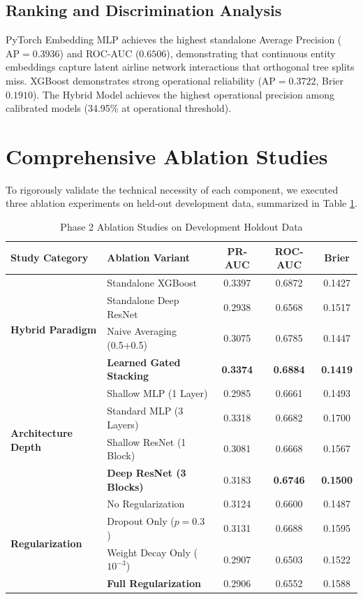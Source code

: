 \documentclass[conference]{IEEEtran}
\begin{document}
\subsection{Ranking and Discrimination Analysis}
PyTorch Embedding MLP achieves the highest standalone Average Precision ($\text{AP} = 0.3936$) and ROC-AUC ($0.6506$), demonstrating that continuous entity embeddings capture latent airline network interactions that orthogonal tree splits miss. XGBoost demonstrates strong operational reliability ($\text{AP} = 0.3722$, Brier $0.1910$). The Hybrid Model achieves the highest operational precision among calibrated models (34.95\% at operational threshold).

\section{Comprehensive Ablation Studies}
To rigorously validate the technical necessity of each component, we executed three ablation experiments on held-out development data, summarized in Table \ref{tab:ablation}.

\begin{table}[h]
\centering
\caption{Phase 2 Ablation Studies on Development Holdout Data}
\label{tab:ablation}
\begin{tabular}{llccc}
\toprule
\textbf{Study Category} & \textbf{Ablation Variant} & \textbf{PR-AUC} & \textbf{ROC-AUC} & \textbf{Brier} \\
\midrule
\multirow{4}{*}{\textbf{Hybrid Paradigm}} 
& Standalone XGBoost & 0.3397 & 0.6872 & 0.1427 \\
& Standalone Deep ResNet & 0.2938 & 0.6568 & 0.1517 \\
& Naive Averaging (0.5+0.5) & 0.3075 & 0.6785 & 0.1447 \\
& \textbf{Learned Gated Stacking} & \textbf{0.3374} & \textbf{0.6884} & \textbf{0.1419} \\
\midrule
\multirow{4}{*}{\textbf{Architecture Depth}} 
& Shallow MLP (1 Layer) & 0.2985 & 0.6661 & 0.1493 \\
& Standard MLP (3 Layers) & 0.3318 & 0.6682 & 0.1700 \\
& Shallow ResNet (1 Block) & 0.3081 & 0.6668 & 0.1567 \\
& \textbf{Deep ResNet (3 Blocks)} & 0.3183 & \textbf{0.6746} & \textbf{0.1500} \\
\midrule
\multirow{4}{*}{\textbf{Regularization}} 
& No Regularization & 0.3124 & 0.6600 & 0.1487 \\
& Dropout Only ($p=0.3$) & 0.3131 & 0.6688 & 0.1595 \\
& Weight Decay Only ($10^{-3}$) & 0.2907 & 0.6503 & 0.1522 \\
& \textbf{Full Regularization} & 0.2906 & 0.6552 & 0.1588 \\
\bottomrule
\end{tabular}
\end{table}
\end{document}
